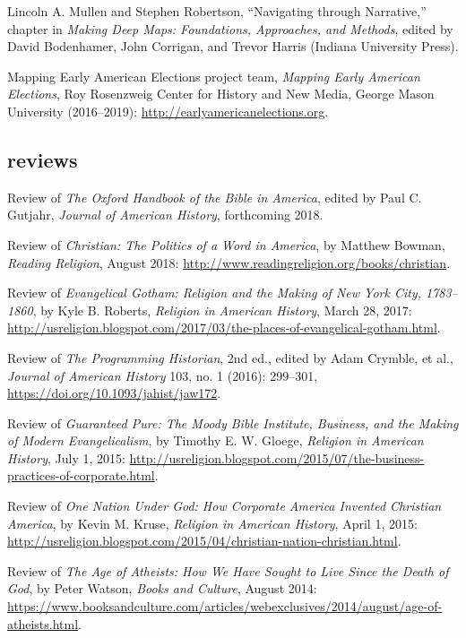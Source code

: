 \documentclass[11pt]{article}
\begin{document}
Lincoln A. Mullen and Stephen Robertson, ``Navigating through Narrative,'' 
chapter in \emph{Making Deep Maps: Foundations, Approaches, and Methods}, 
edited by David Bodenhamer, John Corrigan, and Trevor Harris (Indiana 
University Press).

Mapping Early American Elections project team, \emph{Mapping Early American Elections}, Roy Rosenzweig Center 
for History and New Media, George Mason University (2016--2019): 
\url{http://earlyamericanelections.org}.

\subsection{reviews}\label{book-reviews}

Review of \emph{The Oxford Handbook of the Bible in America}, edited by Paul 
C. Gutjahr, \emph{Journal of American History}, forthcoming 2018.

Review of \emph{Christian: The Politics of a Word in America}, by Matthew 
Bowman, \emph{Reading Religion}, August 2018: 
\url{http://www.readingreligion.org/books/christian}.

Review of \emph{Evangelical Gotham: Religion and the Making of New York City, 
  1783--1860}, by Kyle B. Roberts, \emph{Religion in American History}, March 
28, 2017: 
\url{http://usreligion.blogspot.com/2017/03/the-places-of-evangelical-gotham.html}.

Review of \emph{The Programming Historian}, 2nd ed., edited by
Adam Crymble, et al., \emph{Journal of American History} 103, no. 1 (2016): 
299--301, \url{https://doi.org/10.1093/jahist/jaw172}.

Review of \emph{Guaranteed Pure: The Moody Bible Institute, Business, and the 
  Making of Modern Evangelicalism}, by Timothy E. W. Gloege, \emph{Religion in 
  American History}, July 1, 2015: 
  \url{http://usreligion.blogspot.com/2015/07/the-business-practices-of-corporate.html}.

Review of \emph{One Nation Under God: How Corporate America Invented Christian 
  America}, by Kevin M. Kruse, \emph{Religion in American History}, April 1, 
2015: 
\url{http://usreligion.blogspot.com/2015/04/christian-nation-christian.html}.


Review of \emph{The Age of Atheists: How We Have Sought to Live Since
  the Death of God}, by Peter Watson, \emph{Books and Culture}, August
2014: 
\url{https://www.booksandculture.com/articles/webexclusives/2014/august/age-of-atheists.html}.
\end{document}
